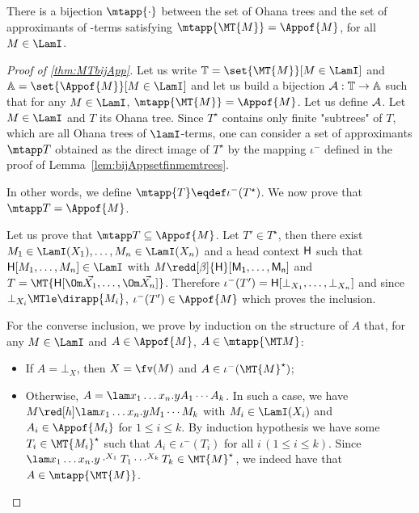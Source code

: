 \begin{theorem}
	There is a bijection $\mtapp{\cdot}$ between the set of Ohana trees 
	and the set of approximants of \lamI-terms satisfying 
	$\mtapp{\MT{M}} = \Appof{M}$, for all $M\in\LamI$.
\end{theorem}


\begin{proof}[Proof of \cref{thm:MTbijApp}] 
	Let us write $\mathbb{T} = \set{\MT{M}}[M\in\LamI]$ and 
	$\mathbb{A} = \set{\Appof{M}}[M\in\LamI]$ and 
	let us build a bijection ${\cal A}: \mathbb{T} \rightarrow \mathbb{A}$ 
	such that for any $M\in\LamI$, $\mtapp{\MT{M}} = \Appof{M}$.
	Let us define ${\cal A}$.
	Let $M\in\LamI$ and $T$ its Ohana tree. 
	Since $T^\star$ contains only finite "subtrees" of $T$, 
	which are all Ohana trees of $\lamI$-terms, 
	one can consider a set of approximants $\mtapp T$ obtained 
	as the direct image of $T^\star$ by the mapping $\iota^-$
	defined in the proof of Lemma~\ref{lem:bijAppsetfinmemtrees}. 
	
	In other words, we define $\mtapp{T} \eqdef \iota^-(T^\star)$. 
	We now prove that $\mtapp T = \Appof{M}$.
	
	Let us prove that $\mtapp T \subseteq \Appof{M}$.
	Let $T'\in T^\star$, then there exist 
	$ M_1\in\LamI(X_1), \dots, M_n\in \LamI(X_n)$ and 
	a head context ${\sf H}$ such that 
	${\sf H}[M_1,\dots, M_n] \in\LamI$ 
	with $M\redd[\beta] {\sf H}[M_1,\dots, M_n]$ 
	and $T = \MT{{\sf H}[\Om\vec{X_1},\dots, \Om\vec{X_n}]}$.
	Therefore $\iota^-(T') = {\sf H}[\bot_{X_1}, \dots, \bot_{X_n}]$ 
	and since $\bot_{X_i}\MTle \dirapp{M_i}$, $\iota^-(T') \in\Appof{M}$ 
	which proves the inclusion. 
	
	For the converse inclusion, 
	we prove by induction on the structure of $A$ that, for any $M\in\LamI$ 
	and $A\in\Appof{M}$, $A\in\mtapp{\MT M}$:
	\begin{itemize}
		\item If $A= \bot_X$, then $X = \fv(M)$ and 
		$A\in \iota^-(\MT{M}^\star)$;
		\item Otherwise, $A = \lam x_1\ldots x_n.yA_1\cdots A_k$. 
		In such a case, we have $M\red[h] \lam x_1\ldots x_n.yM_1\cdots M_k$ 
		with $M_i\in\LamI(X_i)$ and $A_i\in\Appof{M_i}$ 
		for $1\leq i \leq k$. 
		By induction hypothesis we have some $T_i \in\MT{M_i}^\star$ 
		such that $A_i\in \iota^-(T_i)$ for all $i\,(1\leq i \leq k)$. 
		Since $\lam x_1\ldots x_n.y \cdot^{X_1} T_1 \cdots^{X_k} T_k 
		\in\MT{M}^\star$, we indeed have that $A \in \mtapp{\MT{M}}$.
	\end{itemize}
	

\end{proof}
